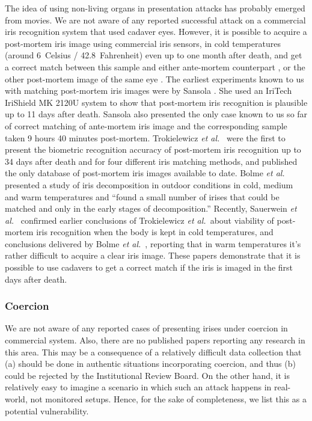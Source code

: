 \documentclass[format=acmsmall, review=false, timestamp=false]{acmart}
\newcommand{\etal}{{\it et al.}~}
\begin{document}
The idea of using non-living organs in presentation attacks has probably emerged from movies{.} We are not aware of any reported successful attack on a commercial iris recognition system that use{d} cadaver eyes. However, it is possible to acquire {a} post-mortem iris image using commercial iris sensors, in cold temperatures {(around 6\degree~Celsius / 42.8\degree~Fahrenheit)} even up to one month after death, and get a correct match between this sample and either ante-mortem counterpart \cite{Sansola_MastersThesis_2015}, or the other post-mortem image of the same eye \cite{Trokielewicz_ICB_2016,Trokielewicz_BTAS_2016}. The earliest experiments known to us with matching post-mortem iris images were by Sansola \cite{Sansola_MastersThesis_2015}. She used an IriTech IriShield MK 2120U system to show that post-mortem iris recognition is plausible up to 11 days after death. Sansola also presented the only case known to us so far of correct matching of ante-mortem iris image and the corresponding sample taken 9 hours 40 minutes post-mortem. Trokielewicz \etal \cite{Trokielewicz_BTAS_2016} were the first to present the {biometric recognition} accuracy of post-mortem iris recognition up to 34 days after death and for four different iris matching methods, and published the only database of post-mortem iris images available to date. Bolme \etal \cite{Bolme_BTAS_2016} presented a study of iris decomposition in outdoor conditions in cold, medium and warm temperatures and ``found a small number of irises that could be matched and only in the early stages of decomposition.'' Recently, Sauerwein \etal \cite{Sauerwein_JFO_2017} confirmed earlier conclusions of Trokielewicz \etal about viability of post-mortem iris recognition when the body is kept in cold temperatures, and conclusions delivered by Bolme \etal, reporting that in warm temperatures it's rather difficult to acquire a clear iris image. These papers demonstrate that it is possible to use cadavers to get a correct match if the iris is imaged in the first days after death.

\subsubsection{Coercion}

We are not aware of any reported cases of presenting irises under coercion in commercial system. Also, there are no published papers reporting any research in this area. This may be a consequence of a relatively difficult data collection that (a) should be done in authentic situations incorporating coercion, and thus (b) could be rejected by the Institutional Review Board. On the other hand, it is relatively easy to imagine a scenario in which such an attack happens in real-world{, not monitored} setups. Hence, for the sake of completeness, we list {this as a potential vulnerability}.
\end{document}
